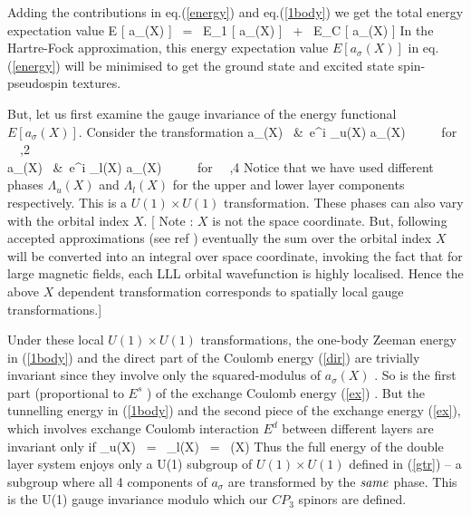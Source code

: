 Adding the contributions in eq.(\ref{energy}) and eq.(\ref{1body}) 
we get the total energy expectation value
\beq E [ a_{\sigma}(X) ] \ = \ E_{1} [ a_{\sigma}(X) ]  \ +  \ 
E_{C} [ a_{\sigma}(X) ] \label{Etot} \eeq
In the Hartre-Fock approximation, this energy expectation value 
$E [ a_{\sigma}(X) ]$ in eq.(\ref{energy}) will be minimised to
get the ground state and excited state spin-pseudospin textures.

But, let us first examine the  gauge invariance of the
 energy functional $E [ a_{\sigma}(X) ]$. Consider the transformation
\beqarr  a_{\sigma}(X) \ &\rightarrow \ e^{i \Lambda_{u}(X)}  
a_{\sigma}(X)  \ \ \ \ \ for \ \  ,2 \nonumber \\
a_{\sigma}(X) \ &\rightarrow \ e^{i \Lambda_{l}(X)}  
a_{\sigma}(X)  \ \ \ \ \ for  \ \ ,4 \label{gtr} \eeqarr 
Notice that we have used  different  phases $\Lambda_{u}(X)$  
and $\Lambda_{l}(X)$ for the  upper and lower layer components
 respectively. This is a $U(1) \times U(1)$ transformation. These 
 phases can also vary with the orbital index $X$. 
[ Note : $X$  is not the space coordinate. But, following
accepted approximations  (see ref \cite{Moon}) eventually the
sum over the orbital index $X$ will  be converted into an
integral over space coordinate, invoking the fact that for large magnetic
fields, each LLL orbital wavefunction is highly localised. 
Hence  the above $X$ dependent
transformation corresponds to spatially local gauge
transformations.] 

Under these local $U(1) \times U(1)$ transformations, the one-body
Zeeman energy in (\ref{1body}) and the direct part of the Coulomb energy
(\ref{dir}) are trivially invariant since they involve only the 
squared-modulus
of $a_{\sigma}(X)$ . So is the first part (proportional to $E^{s}$ ) 
of the exchange Coulomb energy (\ref{ex}) . But the tunnelling energy in
(\ref{1body}) and the second piece of the exchange energy (\ref{ex}),
which involves exchange Coulomb interaction $E^{d}$ between different layers
 are invariant only if 
 \beq \Lambda_{u}(X) \ = \ \Lambda_{l}(X) \ = \ \Lambda (X) \eeq 
 Thus the full energy of the double layer system enjoys only a 
 U(1) subgroup of $U(1) \times U(1)$ defined in (\ref{gtr}) -- 
 a subgroup where all 4 components of $a_{\sigma}$ are transformed by the
 $\it{same}$ phase.  This is the U(1) gauge invariance 
 modulo which our $CP_3$ spinors are defined.
 
